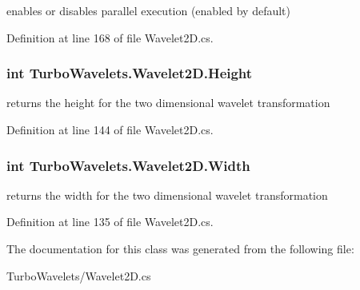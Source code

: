 enables or disables parallel execution (enabled by default) 



\-Definition at line 168 of file \-Wavelet2\-D.\-cs.

\hypertarget{class_turbo_wavelets_1_1_wavelet2_d_a277d0f89d73f839350c64a83ccd76ff6}{
\subsubsection[{\-Height}]{\setlength{\rightskip}{0pt plus 5cm}int {\bf \-Turbo\-Wavelets.\-Wavelet2\-D.\-Height}}}\label{class_turbo_wavelets_1_1_wavelet2_d_a277d0f89d73f839350c64a83ccd76ff6}


returns the height for the two dimensional wavelet transformation 



\-Definition at line 144 of file \-Wavelet2\-D.\-cs.

\hypertarget{class_turbo_wavelets_1_1_wavelet2_d_a30058c5e0e5bd95b29bc080efbcf9083}{
\subsubsection[{\-Width}]{\setlength{\rightskip}{0pt plus 5cm}int {\bf \-Turbo\-Wavelets.\-Wavelet2\-D.\-Width}}}\label{class_turbo_wavelets_1_1_wavelet2_d_a30058c5e0e5bd95b29bc080efbcf9083}


returns the width for the two dimensional wavelet transformation 



\-Definition at line 135 of file \-Wavelet2\-D.\-cs.



\-The documentation for this class was generated from the following file\-:\begin{DoxyCompactItemize}
\item 
\-Turbo\-Wavelets/\-Wavelet2\-D.\-cs\end{DoxyCompactItemize}
